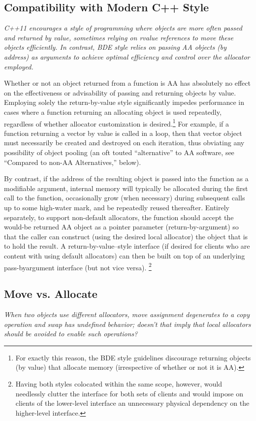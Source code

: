 \subsection{Compatibility with Modern C++ Style}
\emph{C++11 encourages a style of programming where objects are more often passed and
returned by value, sometimes relying on rvalue references to move these objects
efficiently. In contrast, BDE style relies on passing AA objects (by address) as
arguments to achieve optimal efficiency and control over the allocator employed.}

Whether or not an object returned from a function is AA has absolutely no effect on
the effectiveness or advisability of passing and returning objects by value.
Employing solely the return-by-value style significantly impedes performance in
cases where a function returning an allocating object is used repeatedly, regardless
of whether allocator customization is desired.\footnote{For
exactly this reason, the BDE style guidelines discourage returning objects (by value) that
allocate memory (irrespective of whether or not it is AA).} For example, if a function returning
a vector by value is called in a loop, then that vector object must necessarily be
created and destroyed on each iteration, thus obviating any possibility of object
pooling (an oft touted “alternative” to AA software, see “Compared to non-AA
Alternatives,” below).

By contrast, if the address of the resulting object is passed into the function as a
modifiable argument, internal memory will typically be allocated during the first call
to the function, occasionally grow (when necessary) during subsequent calls up to
some high-water mark, and be repeatedly reused thereafter.
Entirely separately, to support non-default allocators, the function should accept
the would-be returned AA object as a pointer parameter (return-by-argument) so that
the caller can construct (using the desired local allocator) the object that is to hold
the result. A return-by-value–style interface (if desired for clients who are content
with using default allocators) can then be built on top of an underlying pass-byargument interface (but not vice versa).
\footnote{Having both styles colocated within the same scope, however, would needlessly clutter the interface
for both sets of clients and would impose on clients of the lower-level interface an unnecessary
physical dependency on the higher-level interface.}


\subsection{Move vs. Allocate}
\emph{When two objects use different allocators, move assignment degenerates to a copy
operation and swap has undefined behavior; doesn’t that imply that local allocators
should be avoided to enable such operations?}

